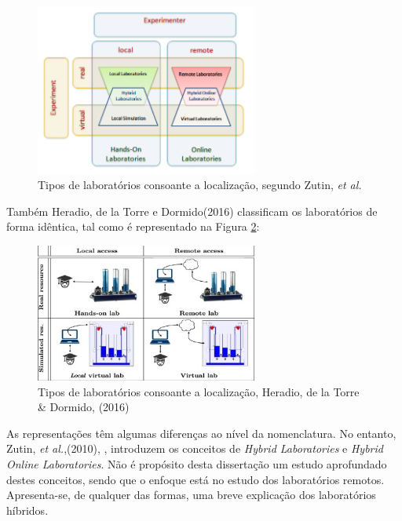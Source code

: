 \begin{figure}[hbtp]
    \centering
    \includegraphics[width=0.65\textwidth]{figures/carac_lab.png}
    \caption{Tipos de laboratórios consoante a localização, segundo Zutin, \textit{et al.} \cite{zutinlab2go}}
    \label{fig:classificaçãozutin}
\end{figure}

Também Heradio, de la Torre e Dormido(2016)\cite{HERADIO20161} classificam os laboratórios de forma idêntica, tal como é representado na Figura \ref{fig:classificaçãoHeratio}:

\begin{figure}[hbtp]
    \centering
    \includegraphics[width=0.65\textwidth]{figures/caracteristica_laboratories.jpg}
    \caption{Tipos de laboratórios consoante a localização, Heradio, de la Torre \& Dormido, (2016) \cite{HERADIO20161}}
    \label{fig:classificaçãoHeratio}
\end{figure}

As representações têm algumas diferenças ao nível da nomenclatura. No entanto, Zutin, \textit{et al.},(2010), \cite{zutinlab2go}, introduzem os conceitos de \textit{Hybrid Laboratories} e \textit{Hybrid Online Laboratories}.
Não é propósito desta dissertação um estudo aprofundado destes conceitos, sendo que o enfoque está no estudo dos laboratórios remotos. Apresenta-se, de qualquer das formas, uma breve explicação dos laboratórios híbridos.

